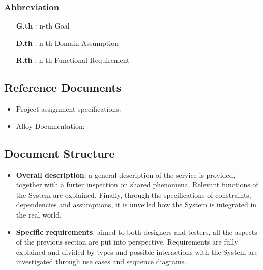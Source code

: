 \subsubsection{Abbreviation}

\begin{itemize}

\item [\textbf{G.th}]: n-th Goal

\item [\textbf{D.th}]: n-th Domain Assumption

\item [\textbf{R.th}]: n-th Functional Requirement

\end{itemize}

\subsection{Reference Documents}

\begin{itemize}

\item Project assignment specifications:\cite{assignment.pdf}

\item Alloy Documentation:\cite{http://alloy.lcs.mit.edu/alloy/documentation.html}

\end{itemize}

\subsection{Document Structure}

\begin{itemize}

\item \textbf{Overall description}: a general description of the service is provided, together with a furter inspection on shared phenomena. Relevant functions of the System are explained. Finally, through the specifications of constraints, dependencies and assumptions, it is unveiled how the System is integrated in the real world.

\item \textbf{Specific requirements}: aimed to both designers and testers, all the aspects of the previous section are put into perspective. Requirements
are fully explained and divided by types and possible interactions with the System are investigated through use cases and sequence diagrams.

\end{itemize}